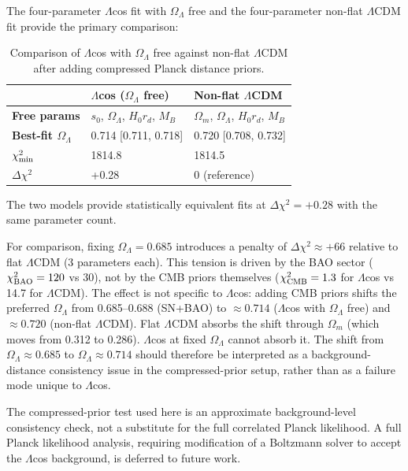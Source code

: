 \documentclass[
  aps,
  prd,
  onecolumn,         %
  nofootinbib,
  longbibliography
]{revtex4-2}
\begin{document}
The four-parameter $\Lambda$cos fit with $\Omega_\Lambda$ free and the four-parameter
non-flat $\Lambda$CDM fit provide the primary comparison:

\begin{table}[!ht]
\centering\footnotesize
\caption{Comparison of $\Lambda$cos with $\Omega_\Lambda$ free against non-flat $\Lambda$CDM after adding compressed Planck distance priors.}\label{tab:cmb-comparison}
\begin{tabular}{@{}lll@{}}
\toprule
& $\Lambda$cos ($\Omega_\Lambda$ free) & Non-flat $\Lambda$CDM \\
\midrule

\textbf{Free params} & $s_0$, $\Omega_\Lambda$, $H_0 r_d$, $M_B$ & $\Omega_m$, $\Omega_\Lambda$, $H_0 r_d$,
$M_B$ \\
\textbf{Best-fit $\Omega_\Lambda$} & 0.714 [0.711, 0.718] & 0.720 [0.708,
0.732] \\
\textbf{$\chi^2_{\rm min}$} & 1814.8 & 1814.5 \\
\textbf{$\Delta\chi^2$} & +0.28 & 0 (reference) \\
\bottomrule
\end{tabular}
\end{table}

The two models provide statistically equivalent fits at $\Delta\chi^2 = +0.28$ with the same
parameter count.

For comparison, fixing $\Omega_\Lambda = 0.685$ introduces a penalty of $\Delta\chi^2 \approx +66$
relative to flat $\Lambda$CDM (3 parameters each). This tension is driven by the
BAO sector ($\chi^2_{\rm BAO} = 120$ vs 30), not by the CMB priors themselves
($\chi^2_{\rm CMB} = 1.3$ for $\Lambda$cos vs 14.7 for $\Lambda$CDM). The effect is not specific to
$\Lambda$cos: adding CMB priors shifts the preferred $\Omega_\Lambda$ from 0.685--0.688
(SN+BAO) to $\approx 0.714$ ($\Lambda$cos with $\Omega_\Lambda$ free) and $\approx 0.720$ (non-flat $\Lambda$CDM).
Flat $\Lambda$CDM absorbs the shift through $\Omega_m$ (which moves from 0.312 to
0.286). $\Lambda$cos at fixed $\Omega_\Lambda$ cannot absorb it. The shift from $\Omega_\Lambda \approx 0.685$
to $\Omega_\Lambda \approx 0.714$ should therefore be interpreted as a background-distance
consistency issue in the compressed-prior setup, rather than as a
failure mode unique to $\Lambda$cos.

The compressed-prior test used here is an approximate background-level
consistency check, not a substitute for the full correlated Planck
likelihood. A full Planck likelihood analysis, requiring modification of
a Boltzmann solver to accept the $\Lambda$cos background, is deferred to
future work.
\end{document}
